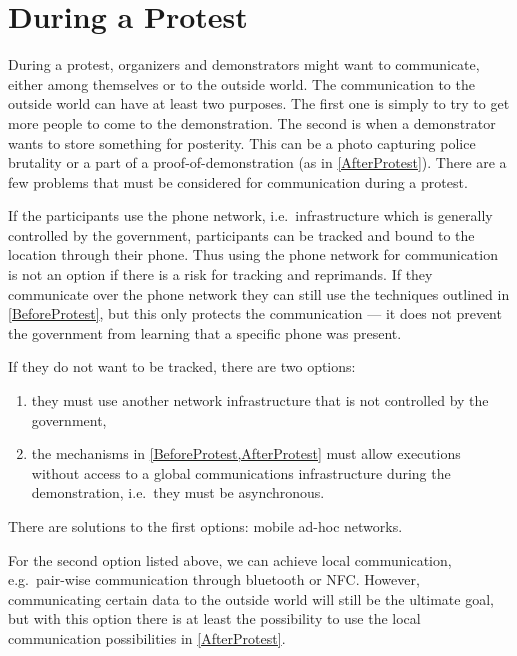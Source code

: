 \section{During a Protest}
\label{DuringProtest}

During a protest, organizers and demonstrators might want to communicate, 
either among themselves or to the outside world.
The communication to the outside world can have at least two purposes.
The first one is simply to try to get more people to come to the demonstration.
The second is when a demonstrator wants to store something for posterity.
This can be a photo capturing police brutality or a part of 
a proof-of-demonstration (as in \cref{AfterProtest}).
There are a few problems that must be considered for communication during 
a protest.

If the participants use the phone network, i.e.\ infrastructure which is 
generally controlled by the government, participants can be tracked and bound 
to the location through their phone.
Thus using the phone network for communication is not an option if there is 
a risk for tracking and reprimands.
If they communicate over the phone network they can still use the techniques 
outlined in \cref{BeforeProtest}, but this only protects the communication --- 
it does not prevent the government from learning that a specific phone was 
present.

If they do not want to be tracked, there are two options:
\begin{enumerate}
  \item they must use another network infrastructure that is not controlled by 
    the government,
  \item the mechanisms in \cref{BeforeProtest,AfterProtest} must allow 
    executions without access to a global communications infrastructure during 
    the demonstration, i.e.\ they must be asynchronous.
\end{enumerate}
There are solutions to the first options: mobile ad-hoc networks.


For the second option listed above, we can achieve local communication, e.g.\ 
pair-wise communication through bluetooth or \ac{NFC}.
However, communicating certain data to the outside world will still be the 
ultimate goal, but with this option there is at least the possibility to use 
the local communication possibilities in \cref{AfterProtest}.

